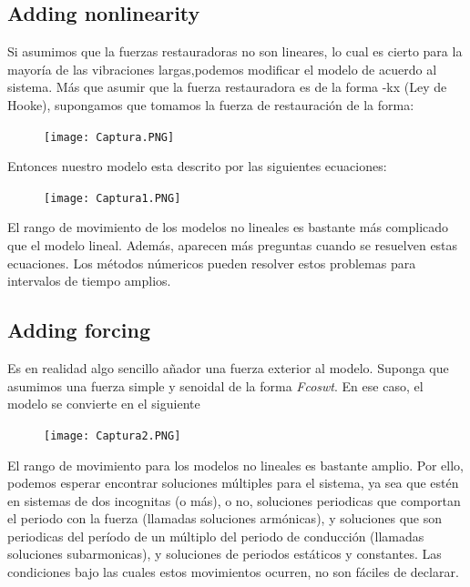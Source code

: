 \documentclass{article}
\begin{document}
\subsection {Adding nonlinearity}
Si asumimos que la fuerzas restauradoras no son lineares, lo cual es cierto para la mayoría de las vibraciones largas,podemos modificar el modelo de acuerdo al sistema. Más que asumir que la fuerza restauradora es de la forma -kx (Ley de Hooke), supongamos que tomamos la fuerza de restauración de la forma:
\begin{figure}[H]
    \texttt{[image: Captura.PNG]}
    \centering
    \label{Cod}
\end{figure}
Entonces nuestro modelo esta descrito por las siguientes ecuaciones:
\begin{figure}[H]
    \texttt{[image: Captura1.PNG]}
    \centering
    \label{Cod}
\end{figure}
El rango de movimiento de los modelos no lineales es bastante más complicado que el modelo lineal. Además, aparecen más preguntas cuando se resuelven estas ecuaciones. Los métodos númericos pueden resolver estos problemas para intervalos de tiempo amplios.

\subsection {Adding forcing}
Es en realidad algo sencillo añador una fuerza exterior al modelo. Suponga que asumimos una fuerza simple y senoidal de la forma \textit{Fcoswt}. En ese caso, el modelo se convierte en el siguiente
\begin{figure}[H]
    \texttt{[image: Captura2.PNG]}
    \centering
    \label{Cod}
\end{figure}
El rango de movimiento para los modelos no lineales es bastante amplio. Por ello, podemos esperar encontrar soluciones múltiples para el sistema, ya sea que estén en sistemas de dos incognitas (o más), o no, soluciones periodicas que comportan el periodo con la fuerza (llamadas soluciones armónicas), y soluciones que son periodicas del período de un múltiplo del periodo de conducción (llamadas soluciones subarmonicas), y soluciones de periodos estáticos y constantes. Las condiciones bajo las cuales estos movimientos ocurren, no son fáciles de declarar.
\end{document}
